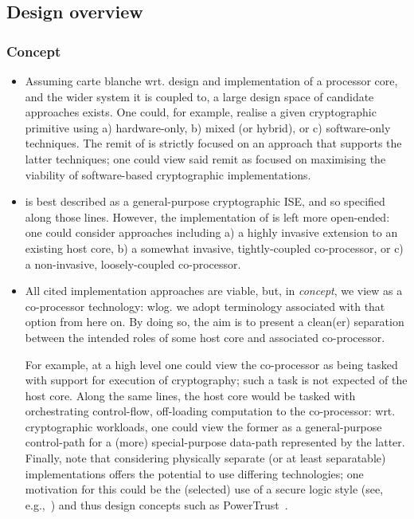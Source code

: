 
\subsection{Design overview}
\label{sec:bg:design}


\subsubsection{Concept}

\begin{itemize}

\item Assuming carte blanche wrt. design and implementation of a processor 
      core, and the wider system it is coupled to, a large design space of 
      candidate approaches exists.  One could, for example, realise a given 
      cryptographic primitive using
      a) hardware-only,
      b) mixed (or hybrid),
         or
      c) software-only
      techniques.
      The remit of \XCID is strictly focused on an approach that supports the
      latter techniques; one could view said remit as focused on maximising
      the viability of software-based cryptographic implementations.

\item \XCID is best described as a general-purpose cryptographic ISE, and so
      specified along those lines.  However, the implementation of \XCID is
      left more open-ended: one could consider approaches including
      a) a highly   invasive extension to an existing host core,
      b) a somewhat invasive, tightly-coupled co-processor,
         or
      c) a      non-invasive, loosely-coupled co-processor.

\item All cited implementation approaches are viable, but, in {\em concept},
      we view \XCID as a co-processor technology: wlog. we adopt terminology 
      associated with that option from here on.  By doing so, the aim is to 
      present a clean(er) separation between the intended roles of some host 
      core and associated \XCID co-processor.

      For example, at a high level one could view the co-processor as being 
      tasked with support for execution of cryptography; such a task is not
      expected of the host core.  Along the same lines, the host core would
      be tasked with orchestrating control-flow, off-loading computation to
      the co-processor: wrt. cryptographic workloads, one could view the
      former as a general-purpose control-path for a (more) special-purpose 
      data-path represented by the latter.  Finally, note that considering
      physically separate (or at least separatable) implementations offers
      the potential to use differing technologies; one motivation for this 
      could be the (selected) use of a secure logic style 
      (see, e.g.,~\cite{SCARV:MayMur:16})
      and thus design concepts such as PowerTrust~\cite{SCARV:TilKirSze:10}.


\end{itemize}
